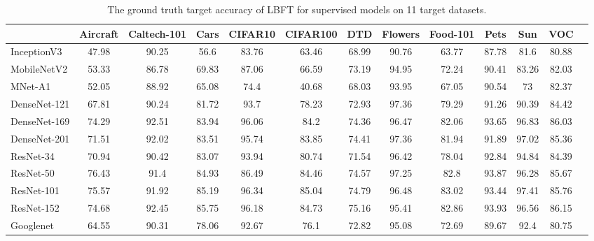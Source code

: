 \begin{table*}\setlength\tabcolsep{5pt}
\footnotesize
    \centering
    \caption{The ground truth target accuracy of LBFT for supervised models on 11 target datasets.}
    \label{tab:lbft_supervised}
    \begin{adjustbox}{max width=\textwidth}
    \begin{tabular}{lcccccccccccc}
        \toprule
        & Aircraft & Caltech-101 & Cars  & CIFAR10 & CIFAR100 & DTD   & Flowers & Food-101 & Pets  & Sun & VOC  \\
        \midrule
        InceptionV3 & 47.98 & 90.25 & 56.6 & 83.76 & 63.46 & 68.99 & 90.76 & 63.77 & 87.78 & 81.6 & 80.88 \\
        MobileNetV2 & 53.33 & 86.78 & 69.83 & 87.06 & 66.59 & 73.19 & 94.95 & 72.24 & 90.41 & 83.26 & 82.03 \\
        MNet-A1 & 52.05 & 88.92 & 65.08 & 74.4 & 40.68 & 68.03 & 93.95 & 67.05 & 90.54 & 73 & 82.37 \\
        DenseNet-121 & 67.81 & 90.24 & 81.72 & 93.7 & 78.23 & 72.93 & 97.36 & 79.29 & 91.26 & 90.39 & 84.42 \\
        DenseNet-169 & 74.29 & 92.51 & 83.94 & 96.06 & 84.2 & 74.36 & 96.47 & 82.06 & 93.65 & 96.83 & 86.03 \\
        DenseNet-201 & 71.51 & 92.02 & 83.51 & 95.74 & 83.85 & 74.41 & 97.36 & 81.94 & 91.89 & 97.02 & 85.36 \\
        ResNet-34 & 70.94 & 90.42 & 83.07 & 93.94 & 80.74 & 71.54 & 96.42 & 78.04 & 92.84 & 94.84 & 84.39 \\
        ResNet-50 & 76.43 & 91.4 & 84.93 & 86.49 & 84.46 & 74.57 & 97.25 & 82.8 & 93.87 & 96.28 & 85.67 \\
        ResNet-101 & 75.57 & 91.92 & 85.19 & 96.34 & 85.04 & 74.79 & 96.48 & 83.02 & 93.44 & 97.41 & 85.76 \\
        ResNet-152 & 74.68 & 92.45 & 85.75 & 96.18 & 84.73 & 75.16 & 95.41 & 82.86 & 93.93 & 96.56 & 86.15 \\
        Googlenet & 64.55 & 90.31 & 78.06 & 92.67 & 76.1 & 72.82 & 95.08 & 72.69 & 89.67 & 92.4 & 80.75 \\
        \bottomrule
    \end{tabular}
    \end{adjustbox}
\end{table*}


